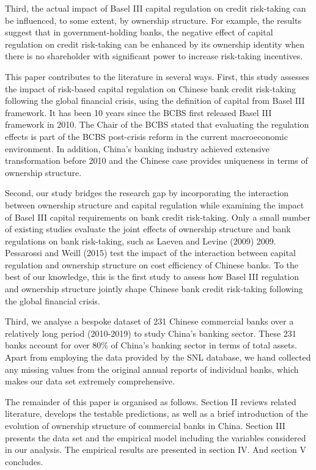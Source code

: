 \documentclass{article}
\begin{document}
Third, the actual impact of Basel III capital regulation on credit
risk-taking can be influenced, to some extent, by ownership structure.
For example, the results suggest that in government-holding banks, the
negative effect of capital regulation on credit risk-taking can be
enhanced by its ownership identity when there is no shareholder with
significant power to increase risk-taking incentives.

This paper contributes to the literature in several ways. First, this
study assesses the impact of risk-based capital regulation on Chinese
bank credit risk-taking following the global financial crisis, using the
definition of capital from Basel III framework. It has been 10 years
since the BCBS first released Basel III framework in 2010. The Chair of
the BCBS stated that evaluating the regulation effects is part of the
BCBS post-crisis reform in the current macroeconomic environment. In
addition, China's banking industry achieved extensive transformation
before 2010 and the Chinese case provides uniqueness in terms of
ownership structure.

Second, our study bridges the research gap by incorporating the
interaction between ownership structure and capital regulation while
examining the impact of Basel III capital requirements on bank credit
risk-taking. Only a small number of existing studies evaluate the joint
effects of ownership structure and bank regulations on bank risk-taking,
such as Laeven and Levine (2009) 2009. Pessarossi and Weill (2015) test
the impact of the interaction between capital regulation and ownership
structure on cost efficiency of Chinese banks. To the best of our
knowledge, this is the first study to assess how Basel III regulation
and ownership structure jointly shape Chinese bank credit risk-taking
following the global financial crisis.

Third, we analyse a bespoke dataset of 231 Chinese commercial banks over
a relatively long period (2010-2019) to study China's banking sector.
These 231 banks account for over 80\% of China's banking sector in terms
of total assets. Apart from employing the data provided by the SNL
database, we hand collected any missing values from the original annual
reports of individual banks, which makes our data set extremely
comprehensive.

The remainder of this paper is organised as follows. Section II reviews
related literature, develops the testable predictions, as well as a
brief introduction of the evolution of ownership structure of commercial
banks in China. Section III presents the data set and the empirical
model including the variables considered in our analysis. The empirical
results are presented in section IV. And section V concludes.
\end{document}
